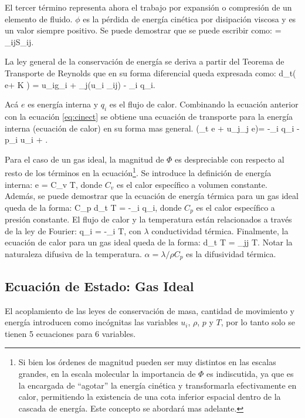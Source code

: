 El tercer término representa ahora el trabajo por expansión o compresión de un elemento de fluido. $\phi$ es la pérdida de energía cinética por disipación viscosa y es un valor siempre positivo. Se puede demostrar que se puede escribir como:
\be 
\Phi = \tau_{ij}S_{ij}.
\ee

La ley general de la conservación de energía se deriva a partir del Teorema de Transporte de Reynolds que en su forma diferencial queda expresada como:
\be 
\rho d_t\left( e+ K \right) = u_i\rho g_i + \partial_j(u_i \sigma_{ij}) - \partial_i q_i.
\ee

Acá $e$ es energía interna y $q_i$ es el flujo de calor. Combinando la ecuación anterior con la ecuación \ref{eq:cinect} se obtiene una ecuación de transporte para la energía interna (ecuación de calor) en su forma mas general.
\be \label{eq:energia_e}
\rho\left(\partial_t e + u_j\partial_j e\right)= -\partial_i q_i - p\partial_i u_i + \Phi.
\ee

Para el caso de un gas ideal, la magnitud de $\Phi$ es despreciable con respecto al resto de los términos en la ecuación\footnote{Si bien los órdenes de magnitud pueden ser muy distintos en las escalas grandes, en la escala molecular la importancia de $\Phi$ es indiscutida, ya que es la encargada de ``agotar'' la energía cinética y transformarla efectivamente en calor, permitiendo la existencia de una cota inferior espacial dentro de la cascada de energía. Este concepto se abordará mas adelante.}. Se introduce la definición de energía interna:
\be 
e = C_v T,
\ee
donde $C_v$ es el calor específico a volumen constante. Además, se puede demostrar que la ecuación de energía térmica para un gas ideal queda de la forma:
\be 
\rho C_p d_t T = -\partial_i q_i,
\ee
donde $C_p$ es el calor específico a presión constante. El flujo de calor y la temperatura están relacionados a través de la ley de Fourier:
\be 
q_i = -\lambda\partial_i T,
\ee
con $\lambda$ conductividad térmica. Finalmente, la ecuación de calor para un gas ideal queda de la forma:
\be 
d_t T = \alpha \partial_{jj} T.
\ee
Notar la naturaleza difusiva de la temperatura. $\alpha = \lambda/\rho C_p$ es la difusividad térmica.
\newpage
\subsection{Ecuación de Estado: Gas Ideal}
El acoplamiento de las leyes de conservación de masa, cantidad de movimiento y energía introducen como incógnitas las variables $u_i$, $\rho$, $p$ y $T$, por lo tanto solo se tienen 5 ecuaciones para 6 variables. 

